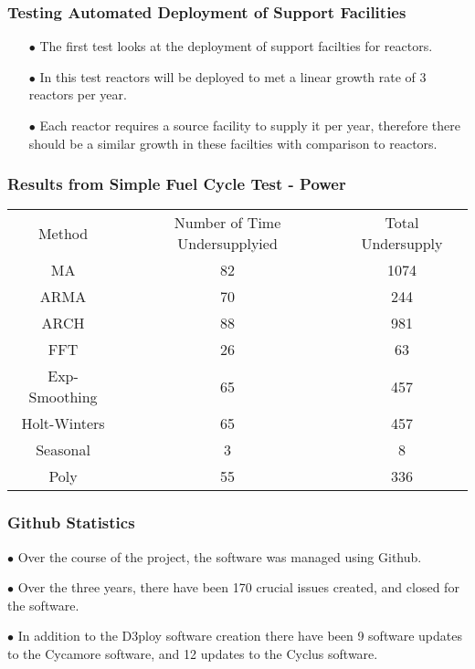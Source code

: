 \begin{frame}
  \frametitle{Testing Automated Deployment of Support Facilities}
  \begin{itemize}
      \item[$\bullet$] The first test looks at the deployment of support
                       facilties for reactors. 
      \item[$\bullet$] In this test reactors will be deployed to met a linear
                       growth rate of 3 reactors per year. 
      \item[$\bullet$] Each reactor requires a source facility to supply it
                       per year, therefore there should be a similar growth
                       in these facilties with comparison to reactors. 
   \end{itemize}        
\end{frame}

\begin{frame}
  \frametitle{Results from Simple Fuel Cycle Test - Power}
        \begin{tabular}{c c c}
        Method & Number of Time Undersupplyied & Total Undersupply \\
        MA & 82 & 1074 \\
        ARMA& 70 & 244 \\
        ARCH & 88 & 981 \\
        FFT & 26 & 63 \\
        Exp-Smoothing & 65 & 457 \\
        Holt-Winters & 65 & 457 \\
        Seasonal & 3 & 8 \\
        Poly & 55 & 336
        \end{tabular}
\end{frame}

\begin{frame}
  \frametitle{Github Statistics}
    \item[$\bullet$] Over the course of the project, the software was 
                    managed using Github.
    \item[$\bullet$] Over the three years, there have been 170 crucial
                     issues created, and closed for the software. 
    \item[$\bullet$] In addition to the D3ploy software creation there
                     have been 9 software updates to the Cycamore software,
                     and 12 updates to the Cyclus software.             
\end{frame}
